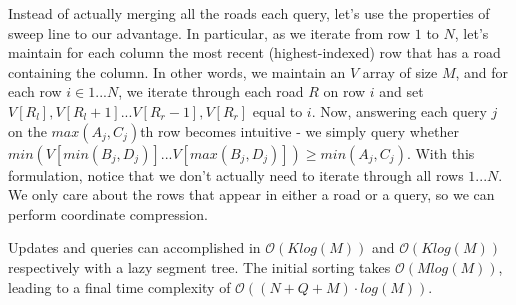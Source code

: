 \documentclass[15pt]{article}
\begin{document}
Instead of actually merging all the roads each query, let's use the properties of sweep line to our advantage. In particular, as we iterate from row $1$ to $N$, let's maintain for each column the most recent (highest-indexed) row that has a road containing the column. In other words, we maintain an $V$ array of size $M$, and for each row $i \in 1 ... N$, we iterate through each road $R$ on row $i$ and set $V[R_l], V[R_l + 1] ... V[R_r - 1], V[R_r]$ equal to $i$. Now, answering each query $j$ on the $max(A_j, C_j)$th row becomes intuitive - we simply query whether $min(V[min(B_j, D_j)] ... V[max(B_j, D_j)]) \geq min(A_j, C_j)$. With this formulation, notice that we don't actually need to iterate through all rows $1...N$. We only care about the rows that appear in either a road or a query, so we can perform coordinate compression.

Updates and queries can accomplished in $\mathcal{O} (K log(M))$ and $ \mathcal{O} (K log(M))$ respectively with a lazy segment tree. The initial sorting takes $\mathcal{O} (M log(M))$, leading to a final time complexity of $\mathcal{O} ((N + Q + M) \cdot log(M))$.
\end{document}
